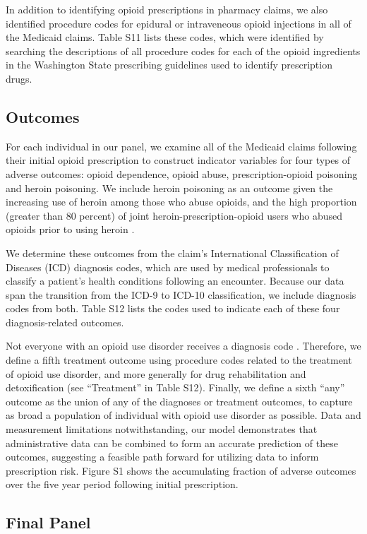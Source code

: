 \documentclass[9pt,twoside]{pnas-new}
\begin{document}
In addition to identifying opioid prescriptions in pharmacy claims, we also identified procedure codes for epidural or intraveneous opioid injections in all of the Medicaid claims. Table S11 lists these codes, which were identified by searching the descriptions of all procedure codes for each of the opioid ingredients in the Washington State prescribing guidelines used to identify prescription drugs.

\subsection{Outcomes}

For each individual in our panel, we examine all of the Medicaid claims following their initial opioid prescription to construct indicator variables for four types of adverse outcomes: opioid dependence, opioid abuse, prescription-opioid poisoning and heroin poisoning. We include heroin poisoning as an outcome given the increasing use of heroin among those who abuse opioids, and the high proportion (greater than 80 percent) of joint heroin-prescription-opioid users who abused opioids prior to using heroin \cite{jones}.

We determine these outcomes from the claim's International Classification of Diseases (ICD) diagnosis codes, which are used by medical professionals to classify a patient's health conditions following an encounter. Because our data span the transition from the ICD-9 to ICD-10 classification, we include diagnosis codes from both. Table S12 lists the codes used to indicate each of these four diagnosis-related outcomes. 

Not everyone with an opioid use disorder receives a diagnosis code \cite{carrell, barocas}. Therefore, we define a fifth treatment outcome using procedure codes related to the treatment of opioid use disorder, and more generally for drug rehabilitation and detoxification (see ``Treatment'' in Table S12). Finally, we define a sixth ``any'' outcome as the union of any of the diagnoses or treatment outcomes, to capture as broad a population of individual with opioid use disorder as possible. Data and measurement limitations notwithstanding, our model demonstrates that administrative data can be combined to form an accurate prediction of these outcomes, suggesting a feasible path forward for utilizing data to inform prescription risk. Figure S1 shows the accumulating fraction of adverse outcomes over the five year period following initial prescription.

\subsection{Final Panel}
\end{document}
